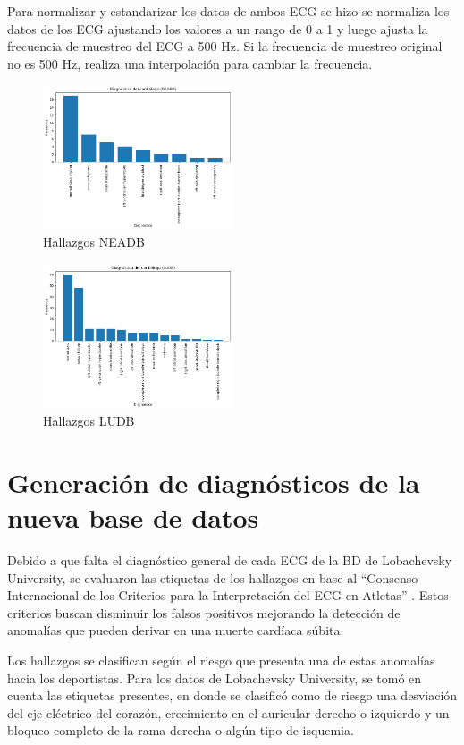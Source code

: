 \documentclass[conference]{IEEEtran}
\begin{document}
Para normalizar y estandarizar los datos de ambos ECG se hizo se normaliza los datos de los ECG 
ajustando los valores a un rango de 0 a 1 y luego ajusta la frecuencia de muestreo del ECG a 500 Hz. 
Si la frecuencia de muestreo original no es 500 Hz, realiza una interpolación para cambiar la frecuencia.
\begin{figure}[H]
    \includegraphics[width=0.5\textwidth]{./graficos/hallazgosNEADB.png}
    \caption{Hallazgos NEADB}
    \label{fig}
\end{figure}
\begin{figure}[H]
    \includegraphics[width=0.5\textwidth]{./graficos/hallazgosLUDB.png} 
    \caption{Hallazgos LUDB}
    \label{fig}
\end{figure}

\section{Generación de diagnósticos de la nueva base de datos}
Debido a que falta el diagnóstico general de cada ECG de la BD de Lobachevsky University, 
se evaluaron las etiquetas de los hallazgos en base al “Consenso Internacional de los Criterios 
para la Interpretación del ECG en Atletas” \cite{b3}. Estos criterios buscan disminuir los falsos 
positivos mejorando la detección de anomalías que pueden derivar en una muerte cardíaca súbita.

Los hallazgos se clasifican según el riesgo que presenta una de estas anomalías hacia los deportistas. 
Para los datos de Lobachevsky University, se tomó en cuenta las etiquetas presentes, en donde se clasificó 
como de riesgo una desviación del eje eléctrico del corazón, crecimiento en el auricular derecho o izquierdo 
y un bloqueo completo de la rama derecha o algún tipo de isquemia.
\end{document}
